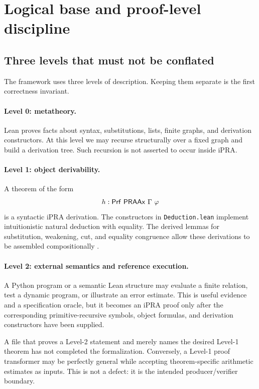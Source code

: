 \section{Logical base and proof-level discipline}
\label{sec:logical-base}

\subsection{Three levels that must not be conflated}

The framework uses three levels of description.  Keeping them separate is the first correctness invariant.

\paragraph{Level 0: metatheory.}
Lean proves facts about syntax, substitutions, lists, finite graphs, and derivation constructors.  At this level we may recurse structurally over a fixed graph and build a derivation tree.  Such recursion is not asserted to occur inside iPRA.

\paragraph{Level 1: object derivability.}
A theorem of the form
\[
  h : \Prf\ \PRAAx\ \Gamma\ \varphi
\]
is a syntactic iPRA derivation.  The constructors in \texttt{Deduction.lean} implement intuitionistic natural deduction with equality.  The derived lemmas for substitution, weakening, cut, and equality congruence allow these derivations to be assembled compositionally \cite{repo-deduction}.

\paragraph{Level 2: external semantics and reference execution.}
A Python program or a semantic Lean structure may evaluate a finite relation, test a dynamic program, or illustrate an error estimate.  This is useful evidence and a specification oracle, but it becomes an iPRA proof only after the corresponding primitive-recursive symbols, object formulas, and derivation constructors have been supplied.

A file that proves a Level-2 statement and merely names the desired Level-1 theorem has not completed the formalization.  Conversely, a Level-1 proof transformer may be perfectly general while accepting theorem-specific arithmetic estimates as inputs.  This is not a defect: it is the intended producer/verifier boundary.

